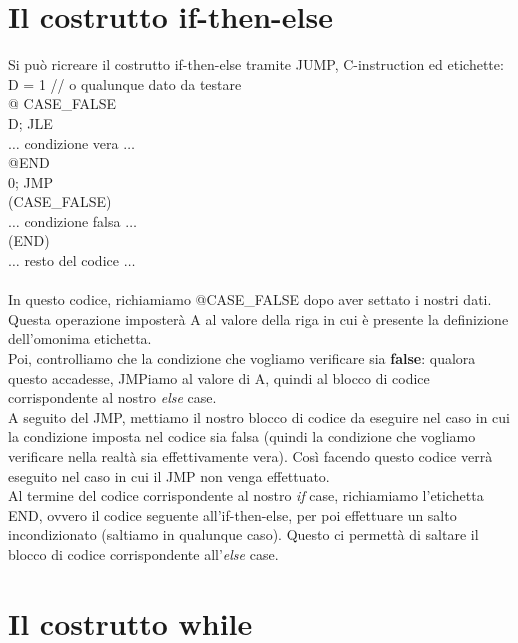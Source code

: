 \documentclass[12pt]{article}
\begin{document}
\section{Il costrutto if-then-else}
Si può ricreare il costrutto if-then-else tramite JUMP, C-instruction ed etichette: \\
D = 1 // o qualunque dato da testare \\
@ CASE\_FALSE \\
D; JLE \\
$\dots$ condizione vera $\dots$ \\
@END \\
0; JMP \\
(CASE\_FALSE) \\
$\dots$ condizione falsa $\dots$ \\
(END) \\
$\dots$ resto del codice $\dots$ \\
\\
In questo codice, richiamiamo @CASE\_FALSE dopo aver settato i nostri dati. Questa operazione imposterà A al valore della riga in cui è presente la definizione dell'omonima etichetta. \\
Poi, controlliamo che la condizione che vogliamo verificare sia \textbf{false}: qualora questo accadesse, JMPiamo al valore di A, quindi al blocco di codice corrispondente al nostro \textit{else} case. \\
A seguito del JMP, mettiamo il nostro blocco di codice da eseguire nel caso in cui la condizione imposta nel codice sia falsa (quindi la condizione che vogliamo verificare nella realtà sia effettivamente vera). Così facendo questo codice verrà eseguito nel caso in cui il JMP non venga effettuato. \\
Al termine del codice corrispondente al nostro \textit{if} case, richiamiamo l'etichetta END, ovvero il codice seguente all'if-then-else, per poi effettuare un salto incondizionato (saltiamo in qualunque caso). Questo ci permettà di saltare il blocco di codice corrispondente all'\textit{else} case. \\
\pagebreak

\section{Il costrutto while}
\end{document}
